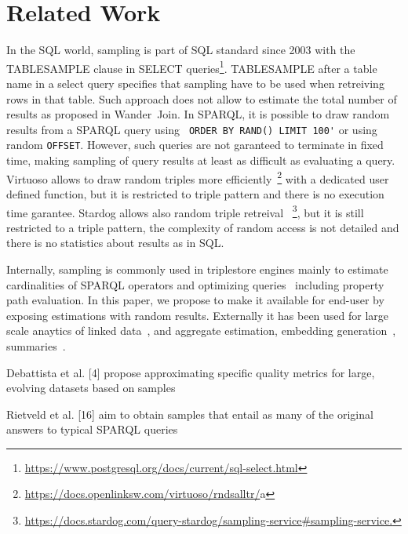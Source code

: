 

\section{Related Work}

In the SQL world, sampling is part of SQL standard since 2003 with the
TABLESAMPLE clause in SELECT
queries\footnote{\url{https://www.postgresql.org/docs/current/sql-select.html}}. TABLESAMPLE
after a table name in a select query specifies that sampling have to
be used when retreiving rows in that table. Such approach does not
allow to estimate the total number of results as proposed in
Wander~Join\cite{li2019wanderjoin}.  In SPARQL, it is possible to draw random
results from a SPARQL query using \verb+ ORDER BY RAND() LIMIT 100'+
or using random \verb+OFFSET+. However, such queries are not garanteed
to terminate in fixed time, making sampling of query results at least as
difficult as evaluating a query. Virtuoso allows to draw
random triples more
efficiently~\footnote{\url{https://docs.openlinksw.com/virtuoso/rndsalltr/}a}
with a dedicated user defined function, but it is restricted to triple
pattern and there is no execution time garantee. Stardog allows also
random triple retreival
~\footnote{\url{https://docs.stardog.com/query-stardog/sampling-service\#sampling-service.}},
but it is still restricted to a triple pattern, the complexity of
random access is not detailed and there is no statistics about results
as in SQL.

Internally, sampling is commonly used in triplestore engines mainly to
estimate cardinalities of SPARQL operators and optimizing
queries~\cite{DBLP:conf/cidr/LeisRGK017} including property path evaluation\cite{10.1007/978-3-031-33455-9_3}. In this paper, we propose to
make it available for end-user by exposing estimations with random
results. Externally it has been used for large scale anaytics of
linked data~\cite{soulet2019anytime}, and aggregate
estimation\cite{li2019wanderjoin}, embedding
generation~\cite{ristoski2016rdf2vec}, summaries~\cite{10.1007/978-3-030-49461-2_10}.

Debattista et al. [4] propose approximating specific quality metrics
for large, evolving datasets based on
samples~\cite{10.1007/978-3-319-18818-8_14}

Rietveld et al. [16] aim to obtain samples that entail as many of the
original answers to typical SPARQL queries~\cite{10.1007/978-3-319-11915-1_6}




